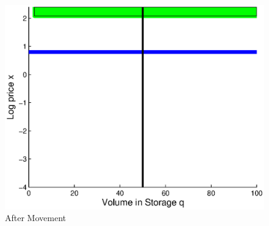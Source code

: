 \documentclass{beamer}
\begin{document}
\begin{frame}
\begin{columns}
{\begin{figure}[hbt]
  \includegraphics[scale = 0.4]{Where2Move1step.eps}
  \caption{After Movement}
\end{figure}
}
\end{columns}
\end{frame}
\end{document}
